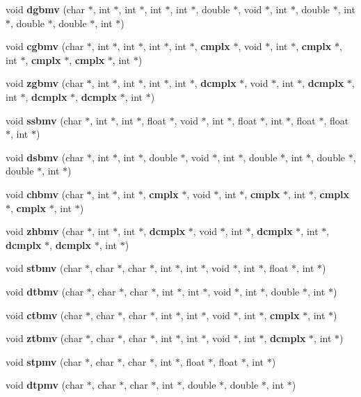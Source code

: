 \begin{CompactItemize}
\item 
void {\bf dgbmv} (char $\ast$, int $\ast$, int $\ast$, int $\ast$, int $\ast$, double $\ast$, void $\ast$, int $\ast$, double $\ast$, int $\ast$, double $\ast$, double $\ast$, int $\ast$)
\item 
void {\bf cgbmv} (char $\ast$, int $\ast$, int $\ast$, int $\ast$, int $\ast$, {\bf cmplx} $\ast$, void $\ast$, int $\ast$, {\bf cmplx} $\ast$, int $\ast$, {\bf cmplx} $\ast$, {\bf cmplx} $\ast$, int $\ast$)
\item 
void {\bf zgbmv} (char $\ast$, int $\ast$, int $\ast$, int $\ast$, int $\ast$, {\bf dcmplx} $\ast$, void $\ast$, int $\ast$, {\bf dcmplx} $\ast$, int $\ast$, {\bf dcmplx} $\ast$, {\bf dcmplx} $\ast$, int $\ast$)
\item 
void {\bf ssbmv} (char $\ast$, int $\ast$, int $\ast$, float $\ast$, void $\ast$, int $\ast$, float $\ast$, int $\ast$, float $\ast$, float $\ast$, int $\ast$)
\item 
void {\bf dsbmv} (char $\ast$, int $\ast$, int $\ast$, double $\ast$, void $\ast$, int $\ast$, double $\ast$, int $\ast$, double $\ast$, double $\ast$, int $\ast$)
\item 
void {\bf chbmv} (char $\ast$, int $\ast$, int $\ast$, {\bf cmplx} $\ast$, void $\ast$, int $\ast$, {\bf cmplx} $\ast$, int $\ast$, {\bf cmplx} $\ast$, {\bf cmplx} $\ast$, int $\ast$)
\item 
void {\bf zhbmv} (char $\ast$, int $\ast$, int $\ast$, {\bf dcmplx} $\ast$, void $\ast$, int $\ast$, {\bf dcmplx} $\ast$, int $\ast$, {\bf dcmplx} $\ast$, {\bf dcmplx} $\ast$, int $\ast$)
\item 
void {\bf stbmv} (char $\ast$, char $\ast$, char $\ast$, int $\ast$, int $\ast$, void $\ast$, int $\ast$, float $\ast$, int $\ast$)
\item 
void {\bf dtbmv} (char $\ast$, char $\ast$, char $\ast$, int $\ast$, int $\ast$, void $\ast$, int $\ast$, double $\ast$, int $\ast$)
\item 
void {\bf ctbmv} (char $\ast$, char $\ast$, char $\ast$, int $\ast$, int $\ast$, void $\ast$, int $\ast$, {\bf cmplx} $\ast$, int $\ast$)
\item 
void {\bf ztbmv} (char $\ast$, char $\ast$, char $\ast$, int $\ast$, int $\ast$, void $\ast$, int $\ast$, {\bf dcmplx} $\ast$, int $\ast$)
\item 
void {\bf stpmv} (char $\ast$, char $\ast$, char $\ast$, int $\ast$, float $\ast$, float $\ast$, int $\ast$)
\item 
void {\bf dtpmv} (char $\ast$, char $\ast$, char $\ast$, int $\ast$, double $\ast$, double $\ast$, int $\ast$)

\end{CompactItemize}
